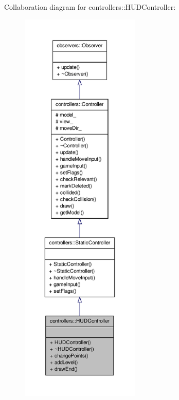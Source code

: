 \-Collaboration diagram for controllers\-:\-:\-H\-U\-D\-Controller\-:
\nopagebreak
\begin{figure}[H]
\begin{center}
\leavevmode
\includegraphics[height=550pt]{d7/d39/classcontrollers_1_1HUDController__coll__graph}
\end{center}
\end{figure}
